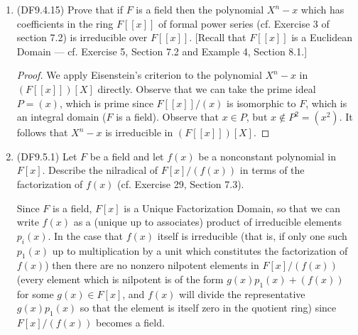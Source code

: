 \documentclass[11pt]{article}
\begin{document}
\begin{enumerate}
\begin{proof}
        For any elements $a(\overline{x}), b(\overline{x})\in K_1$, we have that $\varphi(a(\overline{x}) + b(\overline{x})) = a(\overline{y}+1) + b(\overline{y}+1) = \varphi(a(\overline{x})) + \varphi(b(\overline{x}))$ and $\varphi(a(\overline{x})b(\overline{x})) = a(\overline{y}+1)b(\overline{y}+1) = \varphi(a(\overline(x)))\varphi(b(\overline{x)}))$. Furthermore, the multiplicative identity in $K_1$ identity is the class $1$, which is evidently mapped into the same class $1$ in $K_2$. Thus $\varphi$ is a ring (field) homomorphism. It suffices to show that this map is injective (since injective maps between sets of the same finite size are surjective), which we do using the trivial kernel characterization: Suppose some element $a(\overline{x})$ is mapped to the zero class in $K_2$; that is, $a(y+1)$ is divisible by $y^2+2y+1$. This is equivalent to saying that $a(x)$ is divisible by $x^2+1$, since we can make the invertible change of variables $x\mapsto y+1$ to obtain $x^2+1\mapsto (y+1)^2 + 1 = y^2+2y+2$. Hence $a(\overline{x})$ had to be the zero class in $K_1$, from which it follows that the kernel of $\varphi$ is trivial and so $\varphi$ is injective. Since both $K_1,K_2$ have the same finite size ($121$), it follows that $\varphi$ is surjective also and hence bijective. Thus $\varphi$ is a field isomorphism from $K_1$ to $K_2$.
    \end{proof}
    \item (DF9.4.15) Prove that if $F$ is a field then the polynomial $X^n-x$ which has coefficients in the ring $F[[x]]$ of formal power series (cf. Exercise 3 of section 7.2) is irreducible over $F[[x]]$. [Recall that $F[[x]]$ is a Euclidean Domain --- cf. Exercise 5, Section 7.2 and Example 4, Section 8.1.] \begin{proof}
      We apply Eisenstein's criterion to the polynomial $X^n-x$ in $(F[[x]])[X]$ directly. Observe that we can take the prime ideal $P = (x)$, which is prime since $F[[x]]/(x)$ is isomorphic to $F$, which is an integral domain ($F$ is a field). Observe that $x\in P$, but $x\not \in P^2 = (x^2)$. It follows that $X^n-x$ is irreducible in $(F[[x]])[X]$.
    \end{proof}
    \item (DF9.5.1) Let $F$ be a field and let $f(x)$ be a nonconstant polynomial in $F[x]$. Describe the nilradical of $F[x]/(f(x))$ in terms of the factorization of $f(x)$ (cf. Exercise 29, Section 7.3).
    
    Since $F$ is a field, $F[x]$ is a Unique Factorization Domain, so that we can write $f(x)$ as a (unique up to associates) product of irreducible elements $p_i(x)$. In the case that $f(x)$ itself is irreducible (that is, if only one such $p_1(x)$ up to multiplication by a unit which constitutes the factorization of $f(x)$) then there are no nonzero nilpotent elements in $F[x]/(f(x))$ (every element which is nilpotent is of the form $g(x)p_1(x)+ (f(x))$ for some $g(x)\in F[x]$, and $f(x)$ will divide the representative $g(x)p_1(x)$ so that the element is itself zero in the quotient ring) since $F[x]/(f(x))$ becomes a field. 
    

\end{enumerate}
\end{document}
